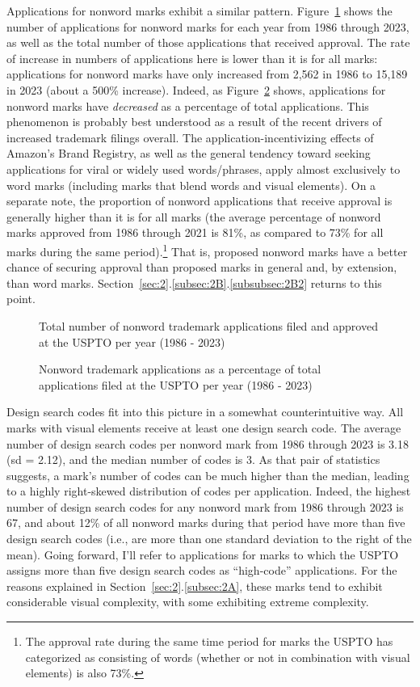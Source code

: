 \documentclass[letterpaper, 11pt, oneside]{article}
\begin{document}
Applications for nonword marks exhibit a similar pattern. Figure~\ref{fig:2} shows the number of applications for nonword marks for each year from 1986 through 2023, as well as the total number of those applications that received approval. The rate of increase in numbers of applications here is lower than it is for all marks: applications for nonword marks have only increased from 2,562 in 1986 to 15,189 in 2023 (about a 500\% increase). Indeed, as Figure~\ref{fig:3} shows, applications for nonword marks have \emph{decreased} as a percentage of total applications. This phenomenon is probably best understood as a result of the recent drivers of increased trademark filings overall. The application-incentivizing effects of Amazon's Brand Registry, as well as the general tendency toward seeking applications for viral or widely used words/phrases, apply almost exclusively to word marks (including marks that blend words and visual elements). On a separate note, the proportion of nonword applications that receive approval is generally higher than it is for all marks (the average percentage of nonword marks approved from 1986 through 2021 is 81\%, as compared to 73\% for all marks during the same period).\footnote{The approval rate during the same time period for marks the USPTO has categorized as consisting of words (whether or not in combination with visual elements) is also 73\%.} That is, proposed nonword marks have a better chance of securing approval than proposed marks in general and, by extension, than word marks. Section~\ref{sec:2}.\ref{subsec:2B}.\ref{subsubsec:2B2} returns to this point.

\begin{figure}[H]
\centering

\caption{\label{fig:2} Total number of nonword trademark applications filed and approved at the USPTO per year (1986 - 2023)}
\end{figure}

\begin{figure}[H]
\centering

\caption{\label{fig:3} Nonword trademark applications as a percentage of total applications filed at the USPTO per year (1986 - 2023)}
\end{figure}

Design search codes fit into this picture in a somewhat counterintuitive way. All marks with visual elements receive at least one design search code. The average number of design search codes per nonword mark from 1986 through 2023 is 3.18 (sd = 2.12), and the median number of codes is 3. As that pair of statistics suggests, a mark's number of codes can be much higher than the median, leading to a highly right-skewed distribution of codes per application. Indeed, the highest number of design search codes for any nonword mark from 1986 through 2023 is 67, and about 12\% of all nonword marks during that period have more than five design search codes (i.e., are more than one standard deviation to the right of the mean). Going forward, I'll refer to applications for marks to which the USPTO assigns more than five design search codes as ``high-code'' applications. For the reasons explained in Section~\ref{sec:2}.\ref{subsec:2A}, these marks tend to exhibit considerable visual complexity, with some exhibiting extreme complexity.
\end{document}
